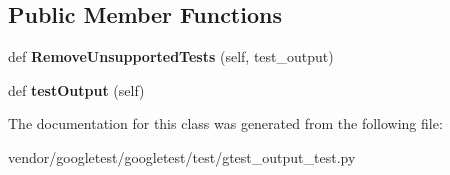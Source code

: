 \subsection*{Public Member Functions}
\begin{DoxyCompactItemize}
\item 
\mbox{\label{classgtest__output__test_1_1_g_test_output_test_a63f62268f795adfc5ca91514dbec2873}} 
def {\bfseries Remove\+Unsupported\+Tests} (self, test\+\_\+output)
\item 
\mbox{\label{classgtest__output__test_1_1_g_test_output_test_a1e6b96f68c5bcb8271de3208fa7f9f64}} 
def {\bfseries test\+Output} (self)
\end{DoxyCompactItemize}


The documentation for this class was generated from the following file\+:\begin{DoxyCompactItemize}
\item 
vendor/googletest/googletest/test/gtest\+\_\+output\+\_\+test.\+py\end{DoxyCompactItemize}
